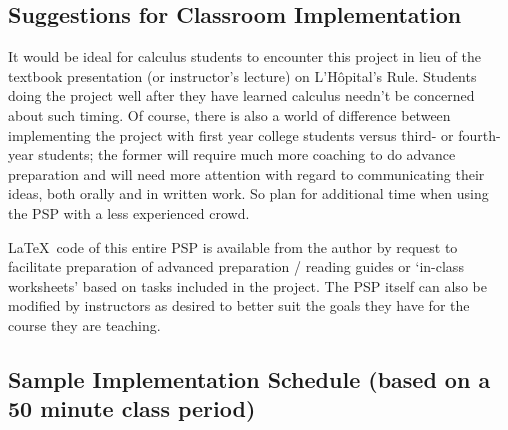 \message{ !name(LHopitalsRule_2021.03.29.tex)}\documentclass[11pt]{article}
\begin{document}
  \vspace*{-6pt}
\subsection*{Suggestions for Classroom Implementation}
  \vspace*{-3pt}

It would be ideal for calculus students to encounter this project in lieu of the textbook presentation (or instructor's lecture) on L'H\^opital's Rule. Students doing the project well after they have learned calculus needn't be concerned about such timing. Of course, there is also a world of difference between implementing the project with first year college students versus third- or fourth-year students; the former will require much more coaching to do advance preparation and will need more attention with regard to communicating their ideas, both orally and in written work. So plan for additional time when using the PSP with a less experienced crowd.


\LaTeX \, code of this entire PSP is available from the author by request to facilitate preparation of  advanced preparation / reading guides or  `in-class worksheets' based on tasks included in the project.   The PSP itself can also be modified by  instructors as desired to better suit the  goals they have for the  course they are teaching.




  \vspace*{-6pt}
\subsection*{Sample Implementation Schedule (based on a 50 minute class period)}%
  \vspace*{-3pt}
\end{document}

